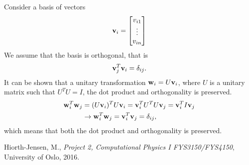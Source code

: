 \documentclass[10pt, a4paper]{amsart}
\begin{document}
Consider a basis of vectors 
\begin{equation}
\vb{v}_i = \begin{bmatrix}
v_{i1} \\
\vdots \\
v_{in}
\end{bmatrix}
\end{equation}
We assume that the basis is orthogonal, that is
\begin{equation}
\vb{v}_j^T\vb{v}_i=\delta_{ij}.
\end{equation}
It can be shown that a unitary transformation $\vb{w}_i = U\vb{v}_i$, where $U$ is a unitary matrix such that $U^TU=I$, the dot product and orthogonality is preserved. 
\begin{align}
\vb{w}_i^T\vb{w}_j &= (U\vb{v}_i)^T  U\vb{v}_i= \vb{v}_i^TU^T U\vb{v}_j = \vb{v}_i^T I \vb{v}_j \nonumber \\
&\rightarrow \vb{w}_i^T\vb{w}_j = \vb{v}_i^T\vb{v}_j = \delta_{ij},
\end{align}
which means that both the dot product and orthogonality is preserved.

\begin{thebibliography}{9}

	Hiorth-Jensen, M.,
	\emph{Project 2, Computational Physics I FYS3150/FYS4150},
	University of Oslo,
	2016.

\end{thebibliography}
\end{document}
